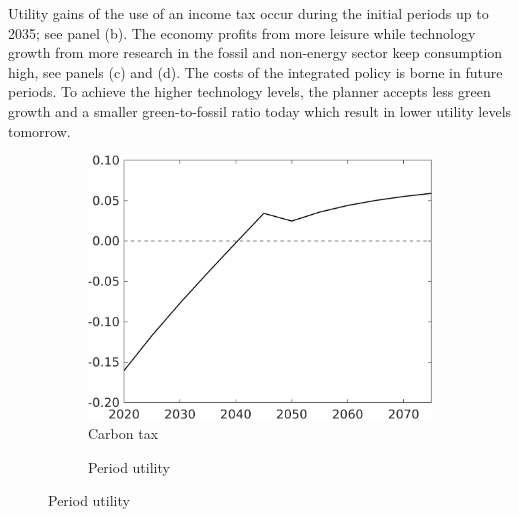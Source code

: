 Utility gains of the use of an income tax occur during the initial periods up to 2035; see panel (b). 
The economy profits from more leisure while technology growth from more research in the fossil and non-energy sector keep consumption high, see panels (c) and (d). 
The costs of the integrated policy is borne in future periods. To achieve the higher technology levels, the planner accepts less green growth and a smaller green-to-fossil ratio today which result in lower utility levels tomorrow. %
\begin{figure}[h!!!]
	\centering
	\caption{Deviation from optimal policy with only a carbon tax}\label{fig:opt_TLs}
	\begin{subfigure}{0.4\textwidth}
		\caption{ Carbon tax}
		\includegraphics[width=1\textwidth]{../../codding_model/own_basedOnFried/optimalPol_010922_revision/figures/all_13Sept22_Tplus30/Tauf_OPT_COMPtaulPer_regime4_spillover0_knspil0_noskill0_sep0_xgrowth0_PV1_etaa0.79.png}
	\end{subfigure}
	\begin{subfigure}{0.4\textwidth}
	\caption{Period utility}

\end{subfigure}
\end{figure}

